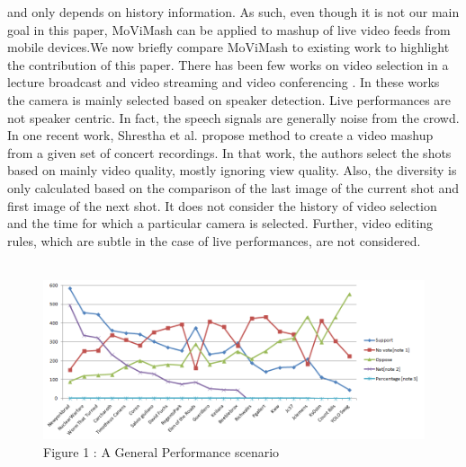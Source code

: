 \documentclass{IEEEtran}
\begin{document}
and only depends on history information. As such, even though it is not our main goal in this paper, MoViMash can be applied to mashup of live video feeds from mobile devices.We now briefly compare MoViMash to existing work to highlight the contribution of this paper. There has been few works on video selection in a lecture broadcast and video streaming and video conferencing \cite{web:3}. In these works the camera is mainly selected based on speaker detection. Live performances are not speaker centric. In fact, the speech signals are generally noise from the crowd. In one recent work, Shrestha et al. \cite{web:15} propose method to create a video mashup from a given set of concert recordings. In that work, the authors select the shots based on mainly video quality, mostly ignoring view quality. Also, the diversity is only calculated based on the comparison of the last image of the current shot and first image of the next shot. It does not consider the history of video selection and the time for which a particular camera is selected. Further, video editing rules, which are subtle in the case of live performances, are not considered.\\\\
\begin{figure}
  \includegraphics[width=\linewidth]{Graph_1.png}
  \caption{Figure 1 : A General Performance scenario}
  \label{Fig1}
\end{figure}
\end{document}

